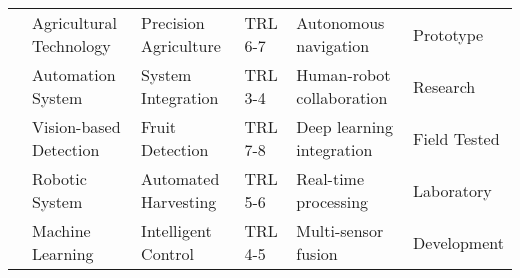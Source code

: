 \begin{table*}[htbp]
\begin{tabular}{@{}p{}p{}p{}p{}p{}p{}@{}}
\cite{r2018research} & Agricultural Technology & Precision Agriculture & TRL 6-7 & Autonomous navigation & Prototype \\
\cite{sharma2020machine} & Automation System & System Integration & TRL 3-4 & Human-robot collaboration & Research \\
\cite{zhang2020technology} & Vision-based Detection & Fruit Detection & TRL 7-8 & Deep learning integration & Field Tested \\
\cite{zhao2013design} & Robotic System & Automated Harvesting & TRL 5-6 & Real-time processing & Laboratory \\
\cite{wang2013reconfigurable} & Machine Learning & Intelligent Control & TRL 4-5 & Multi-sensor fusion & Development \\
\bottomrule
\end{tabular}
\end{table*}